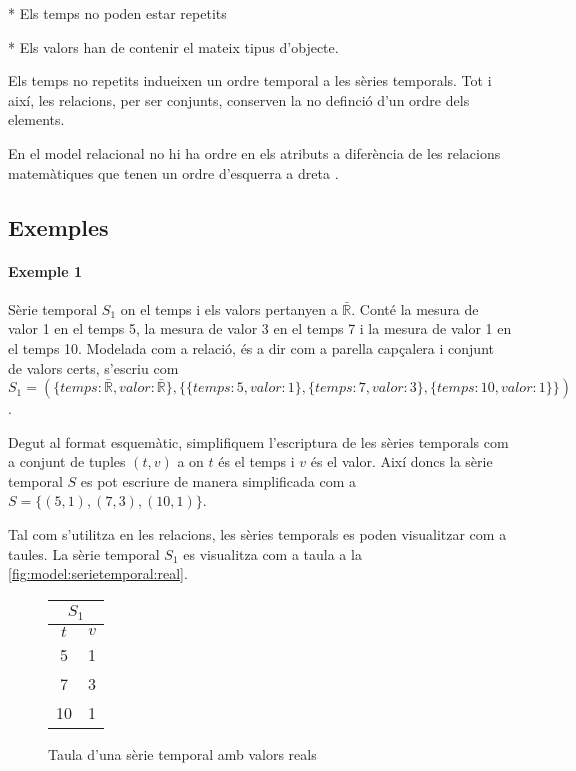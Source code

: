 * Els temps no poden estar repetits

* Els valors han de contenir el mateix tipus d'objecte.

Els temps no repetits indueixen un ordre temporal a les sèries temporals. Tot i així, les relacions, per ser conjunts, conserven la no definció d'un ordre dels elements. 


En el model relacional no hi ha ordre en els atributs a diferència de les relacions matemàtiques que tenen un ordre d'esquerra a dreta \parencite[sec.\ 5.3]{date:introduction}.

\subsection{Exemples}

\paragraph{Exemple 1}
Sèrie temporal $S_1$ on el temps i els valors pertanyen a $\bar{\mathbb{R}}$. Conté la mesura de valor 1 en el temps 5, la mesura de valor 3 en el temps 7 i la mesura de valor 1 en el temps 10. Modelada com a relació, és a dir com a parella capçalera i conjunt de valors certs, s'escriu com 
$S_1 = ( \{temps: \bar{\mathbb{R}}, valor: \bar{\mathbb{R}}\}, \{ \{temps:5,valor:1\}, \{temps:7,valor:3\}, \{temps:10,valor:1\} \} )$.

Degut al format esquemàtic, simplifiquem l'escriptura de les sèries temporals com a conjunt de tuples $(t,v)$ a on $t$ és el temps i $v$ és el valor. Així doncs la sèrie temporal $S$ es pot escriure de manera simplificada com a 
$S = \{ (5,1), (7,3), (10,1) \}$.

Tal com s'utilitza en les relacions, les sèries temporals es poden visualitzar com a taules. La sèrie temporal $S_1$ es visualitza com a taula a la \autoref{fig:model:serietemporal:real}.

\begin{figure}[tp]
  \centering
  \begin{tabular}{|c|c|}
    \multicolumn{2}{c}{$S_1$} \\ \hline
    $t$  & $v$ \\ \hline
    5  & 1 \\
    7  & 3 \\
    10 & 1 \\ \hline
  \end{tabular}
  \caption{Taula d'una sèrie temporal amb valors reals}
  \label{fig:model:serietemporal:real}
\end{figure}


